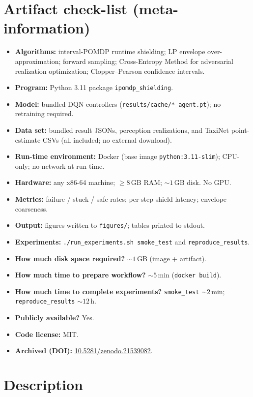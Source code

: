 \documentclass[10pt]{article}
\newcommand{\code}[1]{\texttt{#1}}
\begin{document}
\section*{Artifact check-list (meta-information)}
\begin{itemize}
  \item \textbf{Algorithms:} interval-POMDP runtime shielding; LP envelope
        over-approximation; forward sampling; Cross-Entropy Method for
        adversarial realization optimization; Clopper--Pearson confidence intervals.
  \item \textbf{Program:} Python 3.11 package \code{ipomdp\_shielding}.
  \item \textbf{Model:} bundled DQN controllers (\code{results/cache/*\_agent.pt}); no retraining required.
  \item \textbf{Data set:} bundled result JSONs, perception realizations, and
        TaxiNet point-estimate CSVs (all included; no external download).
  \item \textbf{Run-time environment:} Docker (base image \code{python:3.11-slim}); CPU-only; no network at run time.
  \item \textbf{Hardware:} any x86-64 machine; ${\ge}8$\,GB RAM; ${\sim}1$\,GB disk. No GPU.
  \item \textbf{Metrics:} failure / stuck / safe rates; per-step shield latency; envelope coarseness.
  \item \textbf{Output:} figures written to \code{figures/}; tables printed to stdout.
  \item \textbf{Experiments:} \code{./run\_experiments.sh smoke\_test} and \code{reproduce\_results}.
  \item \textbf{How much disk space required?} ${\sim}1$\,GB (image + artifact).
  \item \textbf{How much time to prepare workflow?} ${\sim}5$\,min (\code{docker build}).
  \item \textbf{How much time to complete experiments?} \code{smoke\_test} ${\sim}2$\,min; \code{reproduce\_results} ${\sim}12$\,h.
  \item \textbf{Publicly available?} Yes. \item \textbf{Code license:} MIT.
  \item \textbf{Archived (DOI):} \href{https://doi.org/10.5281/zenodo.21539082}{10.5281/zenodo.21539082}.
\end{itemize}

\section*{Description}
\end{document}
